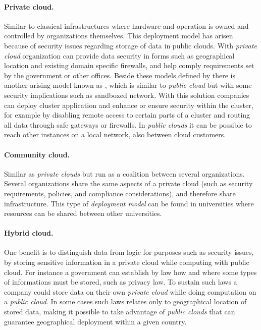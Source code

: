 \paragraph{Private cloud.}

Similar to classical infrastructures where hardware and
operation is owned and controlled by organizations themselves.
This deployment model has arisen because of security issues regarding storage 
of data in public clouds. With \emph{private cloud} organization can provide 
data security in forms such as geographical location and existing domain specific firewalls,
and help comply requirements set by the government or other offices.
Beside these models defined by  there is another arising model known as 
, which is similar to \emph{public cloud} 
but with some security implications such as sandboxed network.
With this solution companies can deploy cluster application and enhance 
or ensure security within the cluster, for example by disabling remote access
to certain parts of a cluster and routing all data through safe gateways or firewalls.
In \emph{public clouds} it can be possible to reach other instances on a local network,
also between cloud customers.

\paragraph{Community cloud.}

Similar as \emph{private clouds} but run as a coalition between several organizations.
Several organizations share the same aspects of
a private cloud (such as security requirements, policies, and compliance considerations),
and therefore share infrastructure. 
This type of \emph{deployment model} can be found in universities where resources 
can be shared between other universities.

\paragraph{Hybrid cloud.}

One benefit is to distinguish data from logic for purposes such as security issues,
by storing sensitive information in a private cloud while computing with public cloud.
For instance a government can establish by law how and where some types of informations 
must be stored, such as privacy law. 
To sustain such laws a company could store data on their own \emph{private cloud}
while doing computation on a \emph{public cloud}.
In some cases such laws relates only to geographical location of stored data,
making it possible to take advantage of \emph{public clouds} that can guarantee
geographical deployment within a given country.

